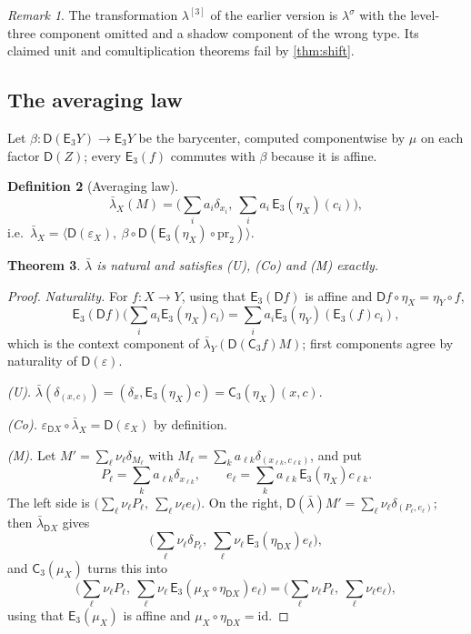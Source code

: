 \documentclass[11pt]{article}
\newtheorem{theorem}{Theorem}[section]
\theoremstyle{definition}
\newtheorem{definition}[theorem]{Definition}
\theoremstyle{remark}
\newtheorem{remark}[theorem]{Remark}
\newcommand{\D}{\mathsf{D}}
\newcommand{\C}{\mathsf{C}}
\newcommand{\E}{\mathsf{E}}
\newcommand{\id}{\mathrm{id}}
\newcommand{\lb}{\bar\lambda}
\newcommand{\ls}{\lambda^{\sigma}}
\begin{document}
\begin{remark}
The transformation $\lambda^{[3]}$ of the earlier version is $\ls$ with the level-three component
omitted and a shadow component of the wrong type. Its claimed unit and comultiplication theorems
fail by \cref{thm:shift}.
\end{remark}

\subsection{The averaging law}

Let $\beta\colon\D(\E_3Y)\to\E_3Y$ be the barycenter, computed componentwise by $\mu$ on each factor
$\D(Z)$; every $\E_3(f)$ commutes with $\beta$ because it is affine.

\begin{definition}[Averaging law]
\[
\lb_X(M)=\Big(\sum_ia_i\delta_{x_i},\ \sum_ia_i\,\E_3(\eta_X)(c_i)\Big),
\]
i.e.\ $\lb_X=\big\langle\D(\varepsilon_X),\ \beta\circ\D(\E_3(\eta_X)\circ\mathrm{pr}_2)\big\rangle$.
\end{definition}

\begin{theorem}\label{thm:avg}
$\lb$ is natural and satisfies (U), (Co) and (M) exactly.
\end{theorem}
\begin{proof}
\emph{Naturality.} For $f\colon X\to Y$, using that $\E_3(\D f)$ is affine and
$\D f\circ\eta_X=\eta_Y\circ f$,
\[
\E_3(\D f)\Big(\sum_ia_i\E_3(\eta_X)c_i\Big)=\sum_ia_i\E_3(\eta_Y)(\E_3(f)c_i),
\]
which is the context component of $\lb_Y(\D(\C_3f)M)$; first components agree by naturality of
$\D(\varepsilon)$.

\emph{(U).} $\lb(\delta_{(x,c)})=(\delta_x,\E_3(\eta_X)c)=\C_3(\eta_X)(x,c)$.

\emph{(Co).} $\varepsilon_{\D X}\circ\lb_X=\D(\varepsilon_X)$ by definition.

\emph{(M).} Let $M'=\sum_\ell\nu_\ell\delta_{M_\ell}$ with
$M_\ell=\sum_ka_{\ell k}\delta_{(x_{\ell k},c_{\ell k})}$, and put
\[
P_\ell=\sum_ka_{\ell k}\delta_{x_{\ell k}},\qquad e_\ell=\sum_ka_{\ell k}\,\E_3(\eta_X)c_{\ell k}.
\]
The left side is
$\big(\sum_\ell\nu_\ell P_\ell,\ \sum_\ell\nu_\ell e_\ell\big)$. On the right,
$\D(\lb)M'=\sum_\ell\nu_\ell\delta_{(P_\ell,e_\ell)}$; then $\lb_{\D X}$ gives
\[
\Big(\sum_\ell\nu_\ell\delta_{P_\ell},\ \sum_\ell\nu_\ell\,\E_3(\eta_{\D X})e_\ell\Big),
\]
and $\C_3(\mu_X)$ turns this into
\[
\Big(\sum_\ell\nu_\ell P_\ell,\ \sum_\ell\nu_\ell\,\E_3(\mu_X\circ\eta_{\D X})e_\ell\Big)
=\Big(\sum_\ell\nu_\ell P_\ell,\ \sum_\ell\nu_\ell e_\ell\Big),
\]
using that $\E_3(\mu_X)$ is affine and $\mu_X\circ\eta_{\D X}=\id$.
\end{proof}
\end{document}
